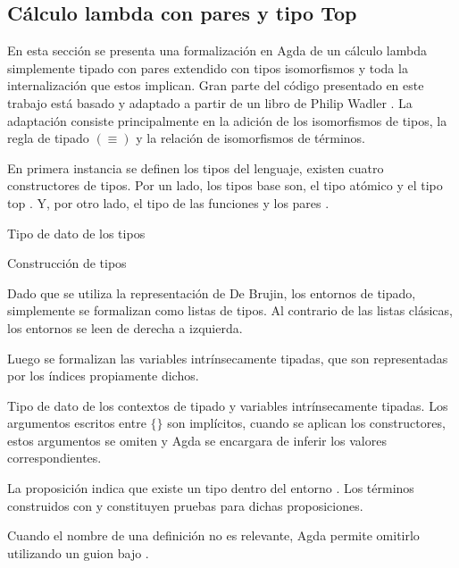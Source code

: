 \subsection{Cálculo lambda con pares y tipo Top}

En esta sección se presenta una formalización en Agda de un cálculo lambda simplemente tipado con pares extendido con tipos isomorfismos y toda la internalización que estos implican.
Gran parte del código presentado en este trabajo está basado y adaptado a partir de un libro de Philip Wadler \cite{plfa}.
La adaptación consiste principalmente en la adición de los isomorfismos de tipos, la regla de tipado $(\equiv)$ y la relación de isomorfismos de términos.

En primera instancia se definen los tipos del lenguaje, existen cuatro constructores de tipos.
Por un lado, los tipos base son, el tipo atómico \const{$\tau$} y el tipo top \const{$\top$}.
Y, por otro lado, el tipo de las funciones \const{$\_\Rightarrow\_$} y los pares \const{$\_\times\_$}.

\begin{codigo}
	Tipo de dato de los tipos
	
\end{codigo}

\begin{example}
	Construcción de tipos
\end{example}

Dado que se utiliza la representación de De Brujin, los entornos de tipado, simplemente se formalizan como listas de tipos.
Al contrario de las listas clásicas, los entornos se leen de derecha a izquierda.

Luego se formalizan las variables intrínsecamente tipadas, que son representadas por los índices propiamente dichos.

\begin{codigo}
	Tipo de dato de los contextos de tipado y variables intrínsecamente tipadas.
	Los argumentos escritos entre $\{\}$ son implícitos, cuando se aplican los constructores, estos argumentos se omiten y Agda se encargara de inferir los valores correspondientes.
\end{codigo}

\begin{example}
	La proposición \bound{$\Gamma$} \const{$\ni$}  indica que existe un tipo  dentro del entorno \bound{$\Gamma$}.
	Los términos construidos con  y  constituyen pruebas para dichas proposiciones.
	
	Cuando el nombre de una definición no es relevante, Agda permite omitirlo utilizando un guion bajo \func{\_}.
	
\end{example}

